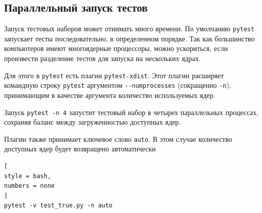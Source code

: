 \documentclass[%
	11pt,
	a4paper,
	utf8,
		]{article}
\begin{document}
\subsection{Параллельный запуск тестов}

Запуск тестовых наборов может отнимать много времени. По умолчанию \texttt{pytest} запускает тесты последовательно, в определенном порядке. Так как большинство компьютеров имеют многоядерные процессоры, можно ускориться, если произвести разделение тестов для запуска на нескольких ядрах.

Для этого в \texttt{pytest} есть плагин \texttt{pytest-xdist}. Этот плагин расширяет командную строку \texttt{pytest} аргументом \verb|--numprocesses| (сокращенно \verb|-n|), принимающим в качестве аргумента количество используемых ядер.

Запуск \texttt{pytest -n 4} запустит тестовый набор в четырех параллельных процессах, сохраняя баланс между загруженностью доступных ядер.

Плагин также принимает ключевое слово \texttt{auto}. В этом случае количество доступных ядер будет возвращено автоматически
\begin{lstlisting}[
style = bash,
numbers = none	
]
pytest -v test_true.py -n auto
\end{lstlisting}
\end{document}
